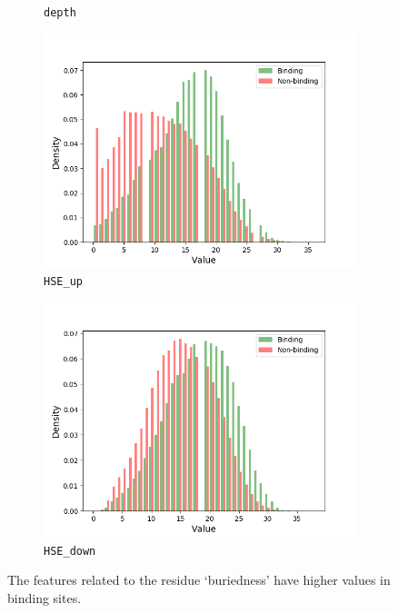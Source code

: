 \begin{figure}[]
\begin{subfigure}{.5\textwidth}
  \caption{\texttt{depth}}
\end{subfigure}
\begin{subfigure}{.5\textwidth}
  \centering
  \includegraphics[width=1\linewidth]{../img/HSE_up_hist.png}
  \caption{\texttt{HSE\_up}}
\end{subfigure}%
\begin{subfigure}{.5\textwidth}
  \centering
  \includegraphics[width=1\linewidth]{../img/HSE_down_hist.png}
  \caption{\texttt{HSE\_down}}
\end{subfigure}
\caption{The features related to the residue `buriedness' have higher values in binding sites.}
\label{fig:buriedness}
\end{figure}

